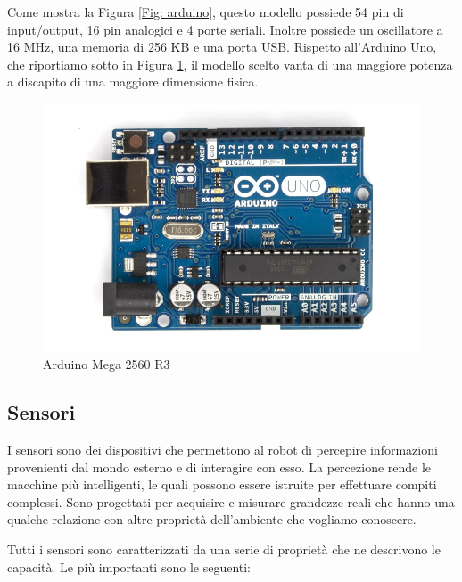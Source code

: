 \documentclass[a4paper,12pt,italian]{article}
\begin{document}
Come mostra la Figura \ref{Fig: arduino}, questo modello possiede 54 pin di input/output, 16 pin analogici e 4 porte seriali. Inoltre possiede un oscillatore a 16 MHz, una memoria di 256 KB e una porta USB. Rispetto all’Arduino Uno, che riportiamo sotto in Figura \ref{Fig: arduino_uno}, il modello scelto vanta di una maggiore potenza a discapito di una maggiore dimensione fisica.

\begin{figure}[H]
\begin{center}
\includegraphics[scale=0.6]{arduino_uno}
\caption{Arduino Mega 2560 R3}
\label{Fig: arduino_uno}
\end{center}
\end{figure}

\subsection{Sensori}
\label{subsec: sensori}
I sensori sono dei dispositivi che permettono al robot di percepire informazioni provenienti dal mondo esterno e di interagire con esso. La percezione rende le macchine più intelligenti, le quali possono essere istruite per effettuare compiti complessi. Sono progettati per acquisire e misurare grandezze reali che hanno una qualche relazione con altre proprietà dell’ambiente che vogliamo conoscere. 

Tutti i sensori sono caratterizzati da una serie di proprietà che ne descrivono le capacità. Le più importanti sono le seguenti:
\end{document}
